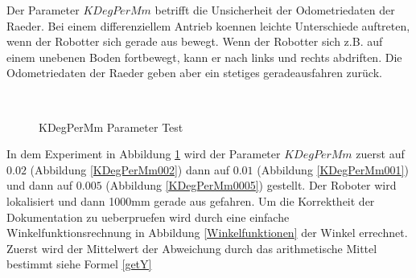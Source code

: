 \documentclass{article}
\begin{document}
\newpage
Der Parameter $KDegPerMm$ betrifft die Unsicherheit der Odometriedaten der Raeder. Bei einem differenziellem Antrieb koennen leichte Unterschiede auftreten, wenn der Robotter sich gerade aus bewegt. Wenn der Robotter sich z.B. auf einem unebenen Boden fortbewegt, kann er nach links und rechts abdriften. Die Odometriedaten der Raeder geben aber ein stetiges geradeausfahren zur\"uck.

\begin{figure}
  \centering
  \ 
  \ 
  \caption{KDegPerMm Parameter Test}
  \label{KDegPerMmTestFigure}
\end{figure}
In dem Experiment in Abbildung \ref{KDegPerMmTestFigure} wird der Parameter $KDegPerMm$ zuerst auf $0.02$ (Abbildung \ref{KDegPerMm002}) dann auf $0.01$ (Abbildung \ref{KDegPerMm001}) und dann auf $0.005$ (Abbildung \ref{KDegPerMm0005}) gestellt. Der Roboter wird lokalisiert und dann 1000mm gerade aus gefahren. Um die Korrektheit der Dokumentation zu ueberpruefen wird
durch eine einfache Winkelfunktionsrechnung in Abbildung \ref{Winkelfunktionen} der Winkel errechnet. 
Zuerst wird der Mittelwert der Abweichung durch das arithmetische Mittel bestimmt siehe Formel \ref{getY}
\end{document}
